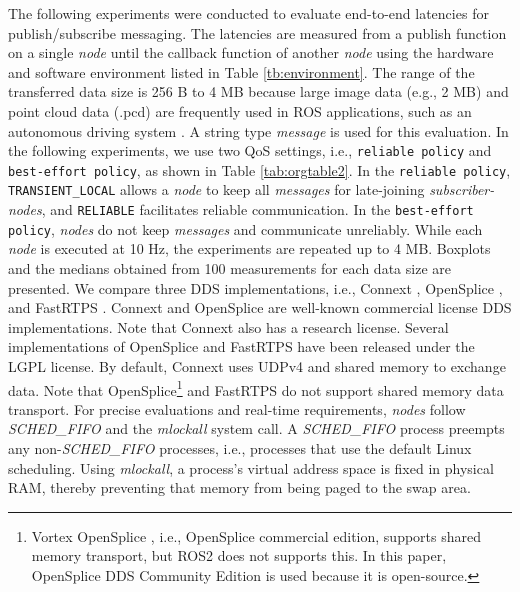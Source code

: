 \documentclass{sig-alternate-05-2015}
\begin{document}
The following experiments were conducted to evaluate end-to-end latencies for publish/subscribe messaging. 
The latencies are measured from a publish function on a single \emph{node} until the callback function of another \emph{node} using the hardware and software environment listed in Table \ref{tb:environment}. 
The range of the transferred data size is 256 B to 4 MB because large image data (e.g., 2 MB) and point cloud data (.pcd) are frequently used in ROS applications, such as an autonomous driving system \cite{kato2015open}.
A string type \emph{message} is used for this evaluation.
In the following experiments, we use two QoS settings, i.e.,  \texttt{reliable policy} and \texttt{best-effort policy}, as shown in Table \ref{tab:orgtable2}. 
In the \texttt{reliable policy}, \texttt{TRANSIENT\_LOCAL} allows a \emph{node} to keep all \emph{messages} for late-joining \emph{subscriber-nodes}, and \texttt{RELIABLE} facilitates reliable communication.
In the \texttt{best-effort policy}, \emph{nodes} do not keep \emph{messages} and communicate unreliably.
While each \emph{node} is executed at 10 Hz, the experiments are repeated up to 4 MB. Boxplots and the medians obtained from 100 measurements for each data size are presented.
We compare three DDS implementations, i.e., Connext \cite{rti_connext}, OpenSplice \cite{ospl_dds_community}, and FastRTPS \cite{fastrtps}. 
Connext and OpenSplice are well-known commercial license DDS implementations. 
Note that Connext also has a research license. 
Several implementations of OpenSplice and FastRTPS have been released under the LGPL license. 
By default, Connext uses UDPv4 and shared memory to exchange data. 
Note that OpenSplice\footnote{Vortex OpenSplice \cite{ospl_vortex}, i.e., OpenSplice commercial edition, supports shared memory transport, but ROS2 does not supports this. In this paper, OpenSplice DDS Community Edition is used because it is open-source.} 
and FastRTPS do not support shared memory data transport. 
For precise evaluations and real-time requirements, \emph{nodes} follow \emph{SCHED\_FIFO} \cite{garg2009real} and the \emph{mlockall} system call. 
A \emph{SCHED\_FIFO} process preempts any non-\emph{SCHED\_FIFO} processes, i.e., processes that use the default Linux scheduling.
Using \emph{mlockall}, a process's virtual address space is fixed in physical RAM, thereby preventing that memory from being paged to the swap area.
\end{document}
